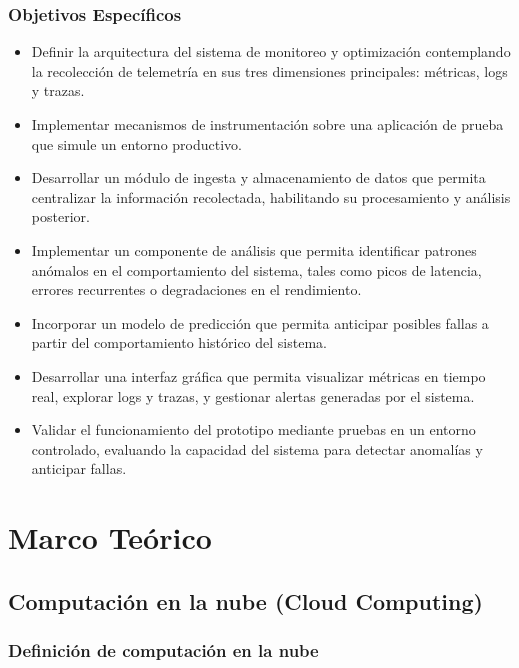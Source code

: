 \documentclass[
]{article}
\begin{document}
\subsubsection{Objetivos Específicos}\label{objetivos-especuxedficos}

\begin{itemize}
\item
  Definir la arquitectura del sistema de monitoreo y optimización
  contemplando la recolección de telemetría en sus tres dimensiones
  principales: métricas, logs y trazas.
\item
  Implementar mecanismos de instrumentación sobre una aplicación de
  prueba que simule un entorno productivo.
\item
  Desarrollar un módulo de ingesta y almacenamiento de datos que permita
  centralizar la información recolectada, habilitando su procesamiento y
  análisis posterior.
\item
  Implementar un componente de análisis que permita identificar patrones
  anómalos en el comportamiento del sistema, tales como picos de
  latencia, errores recurrentes o degradaciones en el rendimiento.
\item
  Incorporar un modelo de predicción que permita anticipar posibles
  fallas a partir del comportamiento histórico del sistema.
\item
  Desarrollar una interfaz gráfica que permita visualizar métricas en
  tiempo real, explorar logs y trazas, y gestionar alertas generadas por
  el sistema.
\item
  Validar el funcionamiento del prototipo mediante pruebas en un entorno
  controlado, evaluando la capacidad del sistema para detectar anomalías
  y anticipar fallas.
\end{itemize}

\section{Marco Teórico}\label{marco-teuxf3rico}

\subsection{Computación en la nube (Cloud
Computing)}\label{computaciuxf3n-en-la-nube-cloud-computing}

\subsubsection{Definición de computación en la
nube}\label{definiciuxf3n-de-computaciuxf3n-en-la-nube}
\end{document}
